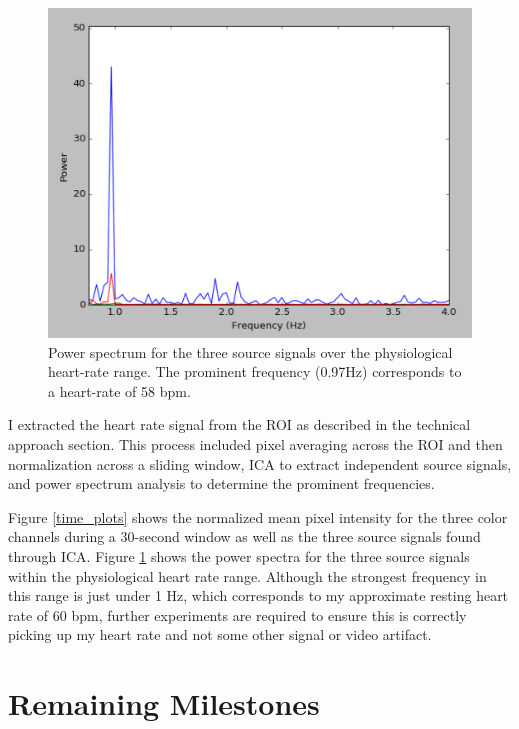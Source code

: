 \documentclass[11pt,twocolumn,letterpaper]{article}
\begin{document}
\begin{figure}
\begin{center}
	\includegraphics[scale=0.41]{pwr_spectrum}
\end{center}
\caption{Power spectrum for the three source signals over the physiological heart-rate range. The prominent frequency (0.97Hz) corresponds to a heart-rate of 58 bpm.}
\label{freq_plot}
\end{figure}

I extracted the heart rate signal from the ROI as described in the technical approach section. This process included pixel averaging across the ROI and then normalization across a sliding window, ICA to extract independent source signals, and power spectrum analysis to determine the prominent frequencies.

Figure \ref{time_plots} shows the normalized mean pixel intensity for the three color channels during a 30-second window as well as the three source signals found through ICA. Figure \ref{freq_plot} shows the power spectra for the three source signals within the physiological heart rate range. Although the strongest frequency in this range is just under 1 Hz, which corresponds to my approximate resting heart rate of 60 bpm, further experiments are required to ensure this is correctly picking up my heart rate and not some other signal or video artifact.

\section*{Remaining Milestones}
\end{document}
